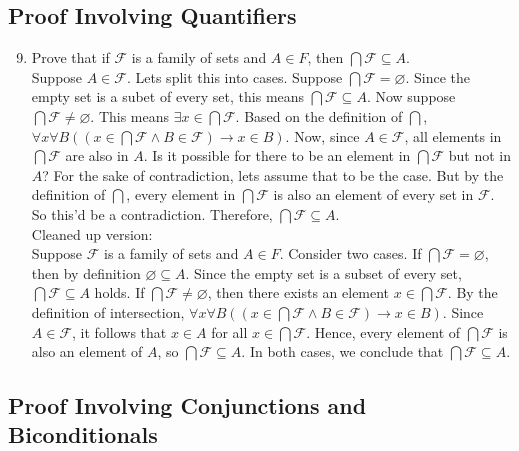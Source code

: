 \documentclass{article}
\begin{document}
\subsection{Proof Involving Quantifiers} 
\begin{enumerate}
\setcounter{enumi}{8}
\item Prove that if $\mathcal{F}$ is a family of sets and $A \in F$, then $\bigcap \mathcal{F} \subseteq A$.\\

\noindent Suppose $A \in \mathcal{F}$. Lets split this into cases. Suppose $\bigcap \mathcal{F} = \varnothing$. Since the empty set is a subet of every set, this means $\bigcap \mathcal{F} \subseteq A$. Now suppose $\bigcap \mathcal{F} \neq \varnothing$. This means $\exists x \in \bigcap \mathcal{F}$. Based on the definition of $\bigcap$, $\forall x \forall B((x \in \bigcap \mathcal{F} \land B \in \mathcal{F}) \rightarrow x \in B)$. Now, since $A \in \mathcal{F}$, all elements in $\bigcap \mathcal{F}$ are also in $A$. Is it possible for there to be an element in $\bigcap \mathcal{F}$ but not in $A$? For the sake of contradiction, lets assume that to be the case. But by the definition of $\bigcap$, every element in $\bigcap \mathcal{F}$ is also an element of every set in $\mathcal{F}$. So this'd be a contradiction. Therefore, $\bigcap \mathcal{F} \subseteq A$.\\

\noindent Cleaned up version:\\
Suppose $\mathcal{F}$ is a family of sets and $A \in F$. Consider two cases. If $\bigcap \mathcal{F} = \varnothing$, then by definition $\varnothing \subseteq A$. Since the empty set is a subset of every set, $\bigcap \mathcal{F} \subseteq A$ holds. If $\bigcap \mathcal{F} \neq \varnothing$, then there exists an element $x \in \bigcap \mathcal{F}$. By the definition of intersection, $\forall x \forall B((x \in \bigcap \mathcal{F} \land B \in \mathcal{F}) \rightarrow x \in B)$. Since $A \in \mathcal{F}$, it follows that $x \in A$ for all $x \in \bigcap \mathcal{F}$. Hence, every element of $\bigcap \mathcal{F}$ is also an element of $A$, so $\bigcap \mathcal{F} \subseteq A$. In both cases, we conclude that $\bigcap \mathcal{F} \subseteq A$.

\end{enumerate}

\subsection{Proof Involving Conjunctions and Biconditionals} 
\end{document}

